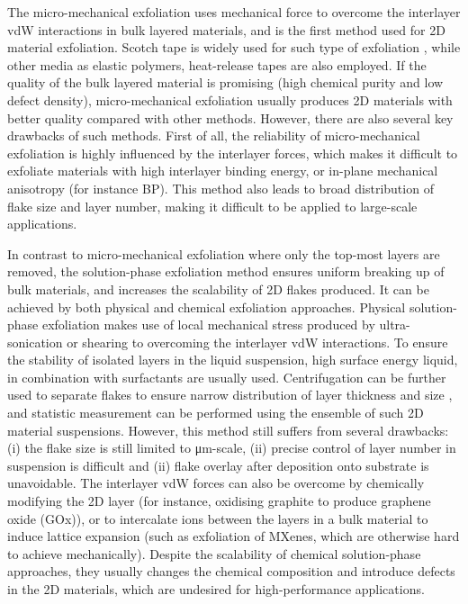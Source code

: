 The micro-mechanical exfoliation uses mechanical force to overcome the
interlayer vdW interactions in bulk layered materials, and is the
first method used for 2D material exfoliation. Scotch tape is widely
used for such type of exfoliation , while
other media as elastic polymers, heat-release tapes are also
employed. If the quality of the bulk layered material is promising
(\ie high chemical purity and low defect density), micro-mechanical
exfoliation usually produces 2D materials with better quality compared
with other methods. However, there are also several key drawbacks of
such methods. First of all, the reliability of micro-mechanical
exfoliation is highly influenced by the interlayer forces, which makes
it difficult to exfoliate materials with high interlayer binding
energy, or in-plane mechanical anisotropy (for instance BP). This
method also leads to broad distribution of flake size and layer
number, making it difficult to be applied to large-scale
applications.

In contrast to micro-mechanical exfoliation where only the top-most
layers are removed, the solution-phase exfoliation method ensures
uniform breaking up of bulk materials, and increases the scalability
of 2D flakes produced. It can be achieved by both physical and
chemical exfoliation approaches. Physical solution-phase exfoliation
makes use of local mechanical stress produced by ultra-sonication or
shearing to overcoming the interlayer vdW interactions. To ensure the
stability of isolated layers in the liquid suspension, high surface
energy liquid, in combination with surfactants are usually
used. 
%
Centrifugation can be further used to separate flakes to ensure narrow
distribution of layer thickness and size , and
statistic measurement can be performed using the ensemble of such 2D
material suspensions.  However, this method still
suffers from several drawbacks: (i) the flake size is still limited to
μm-scale, (ii) precise control of layer number in suspension is difficult and 
(ii) flake overlay after deposition onto substrate is unavoidable.
%
The interlayer vdW forces can also be overcome by chemically modifying
the 2D layer (for instance, oxidising graphite to produce graphene
oxide (GOx)), or to intercalate ions between the layers in a bulk
material to induce lattice expansion (such as exfoliation of MXenes,
which are otherwise hard to achieve mechanically). Despite the
scalability of chemical solution-phase approaches, they usually
changes the chemical composition and introduce defects in the 2D
materials, which are undesired for high-performance
applications. 

